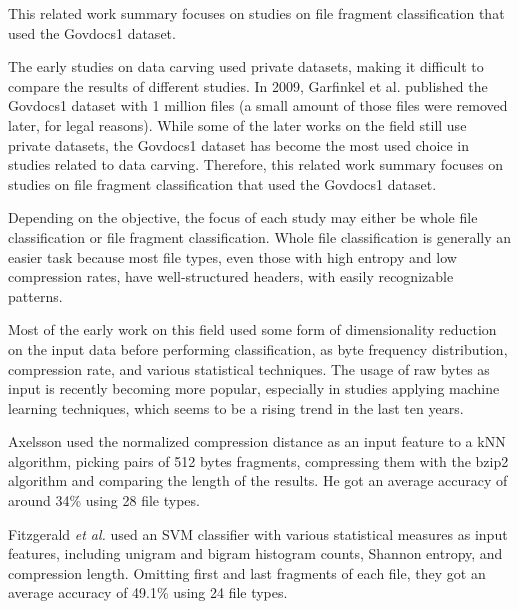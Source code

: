 This related work summary focuses on studies on file fragment classification that used the Govdocs1 dataset\cite{garfinkel_bringing_2009}.

The early studies on data carving used private datasets, making it difficult to compare the results of different studies. In 2009, Garfinkel et al. \cite{garfinkel_bringing_2009} published the Govdocs1 dataset with 1 million files (a small amount of those files were removed later, for legal reasons). While some of the later works on the field still use private datasets, the Govdocs1 dataset has become the most used choice in studies related to data carving.
Therefore, this related work summary focuses on studies on file fragment classification that used the Govdocs1 dataset.

Depending on the objective, the focus of each study may either be whole file classification or file fragment classification. Whole file classification is generally an easier task because most file types, even those with high entropy and low compression rates, have well-structured headers, with easily recognizable patterns.

Most of the early work on this field used some form of dimensionality reduction on the input data before performing classification, as byte frequency distribution, compression rate, and various statistical techniques. The usage of raw bytes as input is recently becoming more popular, especially in studies applying machine learning techniques, which seems to be a rising trend in the last ten years.


Axelsson \cite{axelsson_normalised_2010} used the normalized compression distance as an input feature to a kNN algorithm, picking pairs of 512 bytes fragments, compressing them with the bzip2 algorithm and comparing the length of the results.
He got an average accuracy of around 34\% using 28 file types.


Fitzgerald \textit{et al.} \cite{fitzgerald_using_2012}  used an SVM classifier with various statistical measures as input features, including unigram and bigram histogram counts, Shannon entropy, and compression length.
Omitting first and last fragments of each file, they got an average accuracy of 49.1\% using 24 file types.

